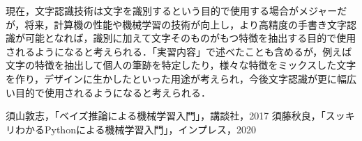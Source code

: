 \documentclass{jlreq}
\begin{document}
現在，文字認識技術は文字を識別するという目的で使用する場合がメジャーだが，将来，計算機の性能や機械学習の技術が向上し，より高精度の手書き文字認識が可能となれば，識別に加えて文字そのものがもつ特徴を抽出する目的で使用されるようになると考えられる．「実習内容」で述べたことも含めるが，例えば文字の特徴を抽出して個人の筆跡を特定したり，様々な特徴をミックスした文字を作り，デザインに生かしたといった用途が考えられ，今後文字認識が更に幅広い目的で使用されるようになると考えられる．

\begin{thebibliography}{99}
     須山敦志，「ベイズ推論による機械学習入門」，講談社，2017
     須藤秋良，「スッキリわかるPythonによる機械学習入門」，インプレス，2020
\end{thebibliography}
\end{document}
